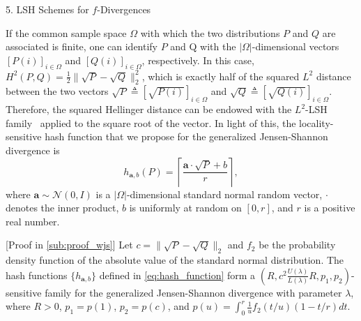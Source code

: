 \documentclass[final]{beamer}
\newlength{\onecolwid}
\begin{document}
\begin{frame}[t]
\begin{columns}[t]
\begin{column}{\onecolwid}
\begin{block}{5. LSH Schemes for $ f $-Divergences}
		
		If the common sample space $ \Omega $ with which the 
		two distributions $ P $ and $ Q $ are associated is finite, one can  
		identify $ P $ and Q with the $ |\Omega| $-dimensional vectors 
		$[P(i)]_{i\in 
			\Omega}$ and $ [Q(i)]_{i\in \Omega} $, respectively.
		In this case, 
		$
		H^2(P, Q) = \frac{1}{2} \| \sqrt{P}-\sqrt{Q} \|_2^2$,
		which is exactly half of the squared $ L^2 $ distance between the two 
		vectors $ 
		\sqrt{P} \triangleq [\sqrt{P(i)}]_{i\in \Omega} $ and $ \sqrt{Q} 
		\triangleq 
		[\sqrt{Q(i)}]_{i\in \Omega} $. Therefore, the squared Hellinger 
		distance can be 
		endowed with the $ L^2 $-LSH family~\citep{datar2004locality} applied 
		to the 
		square root of the vector. In light of this, 
		the locality-sensitive hash function that we propose for the 
		generalized Jensen-Shannon  divergence is 
		\begin{equation}\label{eq:hash_function}
		h_{\mathbf{a}, b}(P) = \left\lceil  \frac{\mathbf{a}\cdot \sqrt{P} +b 
		}{r} 
		\right\rceil,
		\end{equation}
		where $ \mathbf{a}\sim \mathcal{N}(0, I) $ is a $ |\Omega| 
		$-dimensional standard normal random vector, $ 
		\cdot $ denotes the inner product, 
		$ b $ is uniformly at random on $ [0, r] $, and $ r $ is a positive 
		real 
		number. 
		
		[{Proof in 
		\cref{sub:proof_wjs}}]\label{thm:lsh-family}
			Let $ c= \| 
			\sqrt{P}-\sqrt{Q} \|_2$ and $ f_2 $ be the probability density 
			function of the 
			absolute value of the standard normal distribution.	The hash 
			functions $ 
			\{h_{\mathbf{a},b}\}  $ defined in \eqref{eq:hash_function} form a 
			$ (R,c^2\frac{U(\lambda)}{L(\lambda)}R,p_1,p_2) 
			$-sensitive 
			family for the 
			generalized Jensen-Shannon divergence with parameter $ \lambda $, 
			where $ R>0 
			$, $ p_1 = p(1) $, $ p_2=p(c) $, and $
			p(u) = \int_0^r \frac{1}{u}f_2(t/u)(1-t/r)dt$.
		

\end{block}
\end{column}
\end{columns}
\end{frame}
\end{document}
